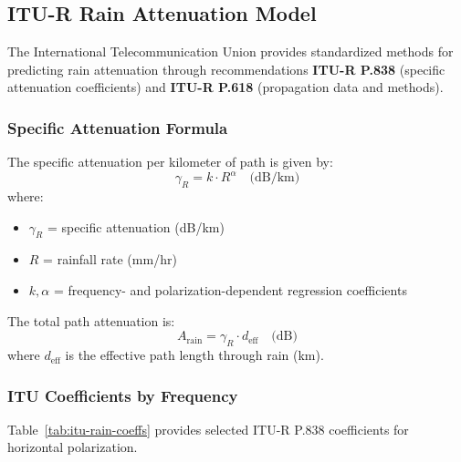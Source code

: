 \subsection{ITU-R Rain Attenuation Model}

The International Telecommunication Union provides standardized methods for predicting rain attenuation through recommendations \textbf{ITU-R P.838} (specific attenuation coefficients) and \textbf{ITU-R P.618} (propagation data and methods).

\subsubsection{Specific Attenuation Formula}

The specific attenuation per kilometer of path is given by:
\begin{equation}
\gamma_R = k \cdot R^\alpha \quad \text{(dB/km)}
\label{eq:rain-specific-atten}
\end{equation}
where:
\begin{itemize}
\item $\gamma_R$ = specific attenuation (dB/km)
\item $R$ = rainfall rate (mm/hr)
\item $k, \alpha$ = frequency- and polarization-dependent regression coefficients
\end{itemize}

The total path attenuation is:
\begin{equation}
A_{\text{rain}} = \gamma_R \cdot d_{\text{eff}} \quad \text{(dB)}
\label{eq:total-rain-atten}
\end{equation}
where $d_{\text{eff}}$ is the effective path length through rain (km).

\subsubsection{ITU Coefficients by Frequency}

Table~\ref{tab:itu-rain-coeffs} provides selected ITU-R P.838 coefficients for horizontal polarization.

